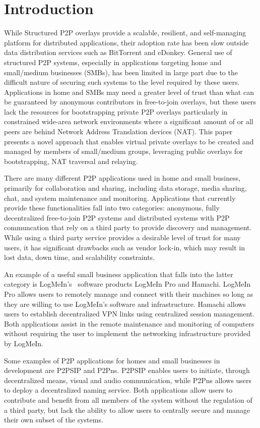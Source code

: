 \documentclass[conference]{IEEEtran}
\begin{document}
\section{Introduction}
While Structured P2P overlays provide a scalable, resilient, and self-managing
platform for distributed applications, their adoption rate has been slow outside
data distribution services such as BitTorrent
and eDonkey.  General use of structured P2P systems, especially in applications
targeting home and small/medium businesses (SMBs), has been limited in large
part due to the difficult nature of securing such systems to the level required
by these users.  Applications in home
and SMBs may need a greater level of trust than what can be guaranteed by
anonymous contributors in free-to-join overlays, but these users lack the
resources for bootstrapping private P2P overlays particularly in constrained
wide-area network environments where a significant amount of or all
peers are behind Network Address Translation devices (NAT). This paper presents
a novel approach that enables virtual private overlays 
to be created and managed by members of small/medium groups, leveraging public
overlays for bootstrapping, NAT traversal and relaying.

There are many different P2P applications used in home and small business,
primarily for collaboration and sharing, including data storage, media
sharing, chat, and system maintenance and monitoring.
Applications that currently provide these functionalities fall into two
categories:  anonymous, fully decentralized free-to-join P2P systems and
distributed systems with P2P communcation that rely on a third party to provide
discovery and management.  While using a third party service provides a desirable
level of trust for many users, it has significant drawbacks such as vendor lock-in,
which may result in lost data, down time, and scalability constraints.

An example of a useful small business application that falls into the latter
category is LogMeIn's~\cite{logmein} software products LogMeIn Pro and Hamachi.
LogMeIn Pro allows users to remotely manage and connect with their machines so
long as they are willing to use LogMeIn's software and infrastructure.  Hamachi
allows users to establish decentralized VPN links using centralized session
management.  Both applications assist in the remote maintenance and monitoring
of computers without requiring the user to implement the networking
infrastructure provided by LogMeIn.

Some examples of P2P applications for homes and small
businesses in development are P2PSIP and P2Pns.  P2PSIP enables users to initiate, through decentralized means, visual
and audio communication, while P2Pns allows users to deploy a decentralized
naming service.  Both applications allow users to contribute and benefit from
all members of the system without the regulation of a third party, but lack the
ability to allow users to centrally secure and manage their own subset of the
systems.
\end{document}
